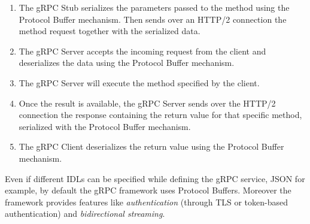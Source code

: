 		\begin{enumerate}
			\item The gRPC Stub serializes the parameters passed to the method using the Protocol Buffer mechanism. Then sends over an HTTP/2 connection the method request together with the serialized data.
			\item The gRPC Server accepts the incoming request from the client and deserializes the data using the Protocol Buffer mechanism.
			\item The gRPC Server will execute the method specified by the client.
			\item Once the result is available, the gRPC Server sends over the HTTP/2 connection the response containing the return value for that specific method, serialized with the Protocol Buffer mechanism.
			\item The gRPC Client deserializes the return value using the Protocol Buffer mechanism.
		\end{enumerate}
		\par Even if different IDLs can be specified while defining the gRPC service, JSON for example, by default the gRPC framework uses Protocol Buffers. Moreover the framework provides features like \textit{authentication} (through TLS or token-based authentication) and \textit{bidirectional streaming}.
		
	\newpage

